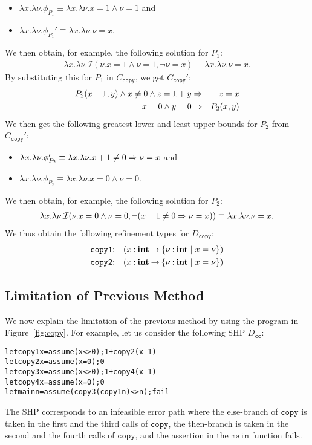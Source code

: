 \begin{itemize}
\item \(\lambda x.\lambda \nu.\phi_{P_1}\equiv \lambda x.\lambda \nu.x=1 \land \nu=1\) and
\item \(\lambda x.\lambda \nu.\phi_{P_1}'\equiv \lambda x.\lambda \nu.\nu=x\).
\end{itemize}
We then obtain, for example, the following solution for \(P_1\):
\begin{eqnarray*}
\lambda x.\lambda \nu.\mathcal{I}(\nu.x=1 \land \nu=1,\neg \nu=x) \equiv \lambda x.\lambda \nu.\nu=x.
\end{eqnarray*}
By substituting this for \(P_1\) in \(C_{\texttt{copy}}\), we get
\(C_{\texttt{copy}}'\):
\begin{eqnarray*}
P_2(x-1,y) \land x\neq0 \land z=1+y &\Rightarrow& z=x \\
x=0 \land y=0 &\Rightarrow& P_2(x,y)
\end{eqnarray*}
We then get the following greatest lower and least upper bounds for
\(P_2\) from \(C_{\texttt{copy}}'\):
\begin{itemize}
\item \(\lambda x.\lambda \nu. \phi_{P_2}' \equiv \lambda x.\lambda \nu. x+1\neq0 \Rightarrow \nu=x\) and
\item \(\lambda x.\lambda \nu. \phi_{P_2} \equiv \lambda x.\lambda \nu. x=0 \land \nu=0\).
\end{itemize}
We then obtain, for example, the following solution for \(P_2\):
\begin{eqnarray*}
\lambda x.\lambda \nu.\mathcal{I}(\nu.x=0 \land \nu=0,\neg (x+1\neq0 \Rightarrow \nu=x)) \equiv \lambda x.\lambda \nu.\nu=x.
\end{eqnarray*}
We thus obtain the following refinement types for \(D_{\texttt{copy}}\):
\begin{eqnarray*}
\texttt{copy1}&\mathbin{:}&(x\mathbin{:}{\mathbf{int}}\mathbin{\rightarrow}{\{{\nu\mathbin{:}\mathbf{int} \mid x=\nu}\}}) \\
\texttt{copy2}&\mathbin{:}&(x\mathbin{:}{\mathbf{int}}\mathbin{\rightarrow}{\{{\nu\mathbin{:}\mathbf{int} \mid x=\nu}\}})
\end{eqnarray*}

\subsection{Limitation of Previous Method}
\label{sec:limit}

We now explain the limitation of the previous method by using the
program in Figure~\ref{fig:copy}.  For example, let us consider the
following SHP \(D_{\texttt{cc}}\):
\begin{alltt}
let copy1 x = assume (x<>0); 1 + copy2 (x-1)
let copy2 x = assume (x=0); 0
let copy3 x = assume (x<>0); 1 + copy4 (x-1)
let copy4 x = assume (x=0); 0
let main n = assume (copy3 (copy1 n) <> n); fail
\end{alltt}
The SHP corresponds to an infeasible error path where the else-branch of
\(\texttt{copy}\) is taken in the first and the third calls of
\(\texttt{copy}\), the then-branch is taken in the second and the fourth
calls of \(\texttt{copy}\), and the assertion in the \(\texttt{main}\)
function fails.

